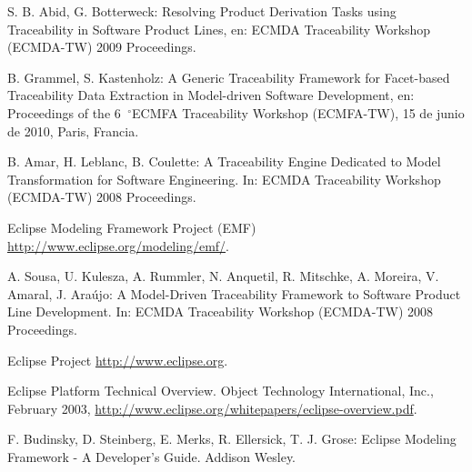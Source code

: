 \documentclass[a4paper,12pt,oneside,spanish]{book}
\newcommand{\grad}{\hspace{-2mm}$\phantom{a}^{\circ}$}
\begin{document}
\begin{thebibliography}{99}
 S. B. Abid, G. Botterweck: Resolving Product Derivation Tasks using Traceability in Software Product Lines, en: ECMDA Traceability Workshop (ECMDA-TW) 2009 Proceedings.

 B. Grammel, S. Kastenholz: A Generic Traceability Framework for Facet-based Traceability Data Extraction in Model-driven Software Development, en: Proceedings of the 6\grad ECMFA Traceability Workshop (ECMFA-TW), 15 de junio de 2010, Paris, Francia.

 B. Amar, H. Leblanc, B. Coulette: A Traceability Engine Dedicated to Model Transformation for Software Engineering. In: ECMDA Traceability Workshop (ECMDA-TW) 2008 Proceedings.

 Eclipse Modeling Framework Project (EMF) \url{http://www.eclipse.org/modeling/emf/}.

 A. Sousa, U. Kulesza, A. Rummler, N. Anquetil, R. Mitschke, A. Moreira, V. Amaral, J. Araújo: A Model-Driven Traceability Framework to Software Product Line Development. In: ECMDA Traceability Workshop (ECMDA-TW) 2008 Proceedings.

 Eclipse Project \url{http://www.eclipse.org}.

 Eclipse Platform Technical Overview. Object Technology International, Inc., February 2003,
\url{http://www.eclipse.org/whitepapers/eclipse-overview.pdf}.

 F. Budinsky, D. Steinberg, E. Merks, R. Ellersick, T. J. Grose: Eclipse Modeling Framework - A Developer's Guide. Addison Wesley.

\end{thebibliography}
\end{document}
